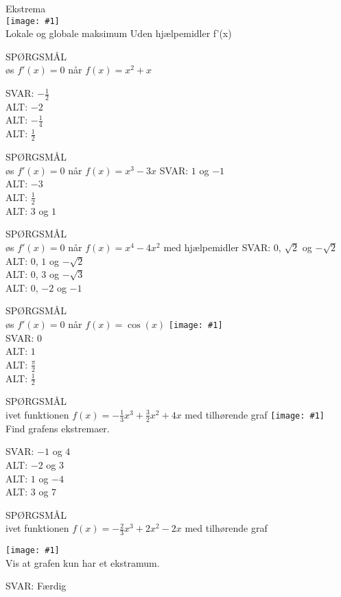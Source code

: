 \documentclass[]{article}
\newcounter{spgcounter}
\newenvironment{question}[2]{\addtocounter{spgcounter}{1} SPØRGSMÅL \thespgcounter\\}{\hspace{50px}}
\newcommand{\name}[1]{{\huge #1}\\}
\newcommand{\tag}[1]{#1}
\newcommand{\cover}[1]{\texttt{[image: \#1]}\\}
\newcommand{\image}[1]{\texttt{[image: \#1]}\\}
\newcommand{\answer}[1]{{\color{green} SVAR: #1}\\}
\newcommand{\alt}[1]{{\color{red} ALT: #1}\\}
\begin{document}
\name{Ekstrema}
\cover{ekstramer.png}
\tag{Lokale og globale maksimum}
\tag{Uden hjælpemidler}
\tag{f'(x)}

\begin{question}{multi}
    
Løs $f'(x)=0$ når $f(x)=x^2+x$

\answer{$-\frac{1}{2}$}
\alt{$-2$}
\alt{$-\frac{1}{4}$}
\alt{$\frac{1}{2}$}

\end{question}
    
    \begin{question}{multi}
    Løs $f'(x)=0$ når $f(x)=x^3 - 3x$
    \answer{$1$ og $-1$}
    \alt{$-3$}
    \alt{$\frac{1}{2}$}
    \alt{$3$ og $1$}
    \end{question}
    
    \begin{question}{multi}
    Løs $f'(x)=0$ når $f(x)=x^4 - 4x^2$ med hjælpemidler
    \answer{$0$, $\sqrt{2}$ og $-\sqrt{2}$}
    \alt{$0$, $1$ og $-\sqrt{2}$}
    \alt{$0$, $3$ og $-\sqrt{3}$}
    \alt{$0$, $-2$ og $-1$}
    \end{question}
                
    \begin{question}{multi}
    Løs $f'(x)=0$ når $f(x)=\cos(x)$
    \image{cos.png}
    \answer{$0$}
    \alt{$1$}
    \alt{$\frac{\pi}{2}$}
    \alt{$\frac{1}{2}$}
    \end{question}

    \begin{question}{multi}
        
        Givet funktionen $f(x) = -\frac{1}{3} x^3 + \frac{3}{2} x^2+ 4 x$ med tilhørende graf
        \image{g1.png}

        Find grafens ekstremaer.
        
        \answer{$-1$ og $4$}
        \alt{$-2$ og $3$}
        \alt{$1$ og $-4$}
        \alt{$3$ og $7$}

    \end{question}

    \begin{question}{multi}
        Givet funktionen $f(x) = -\frac{2}{3} x^3 + 2 x^2 - 2 x$ med tilhørende graf
        
        \image{g2.png}

        Vis at grafen kun har et ekstramum.
        
        \answer{Færdig}

    \end{question}
\end{document}
